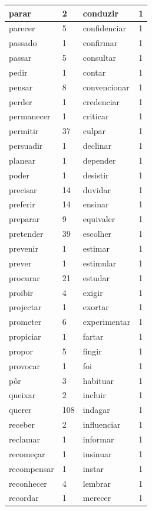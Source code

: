 \documentclass[output=paper,colorlinks,citecolor=brown]{langscibook}
\begin{document}
\begin{longtable}{ p{3cm} | p{1cm} | p{3cm} | p{1cm} }
			parar & 2 & conduzir & 1\\\hline
			parecer & 5 & confidenciar & 1\\\hline
			passado & 1 & confirmar & 1\\\hline
			passar & 5 & consultar & 1\\\hline
			pedir & 1 & contar & 1\\\hline
			pensar & 8 & convencionar & 1\\\hline
			perder & 1 & credenciar & 1\\\hline
			permanecer & 1 & criticar & 1\\\hline
			permitir & 37 & culpar & 1\\\hline
			persuadir & 1 & declinar & 1\\\hline
			planear & 1 & depender & 1\\\hline
			poder & 1 & desistir & 1\\\hline
			precisar & 14 & duvidar & 1\\\hline
			preferir & 14 & ensinar & 1\\\hline
			preparar & 9 & equivaler & 1\\\hline
			pretender & 39 & escolher & 1\\\hline
			prevenir & 1 & estimar & 1\\\hline
			prever & 1 & estimular & 1\\\hline
			procurar & 21 & estudar & 1\\\hline
			proibir & 4 & exigir & 1\\\hline
			projectar & 1 & exortar & 1\\\hline
			prometer & 6 & experimentar & 1\\\hline
			propiciar & 1 & fartar & 1\\\hline
			propor & 5 & fingir & 1\\\hline
			provocar & 1 & foi & 1\\\hline
			pôr & 3 & habituar & 1\\\hline
			queixar & 2 & incluir & 1\\\hline
			querer & 108 & indagar & 1\\\hline
			receber & 2 & influenciar & 1\\\hline
			reclamar & 1 & informar & 1\\\hline
			recomeçar & 1 & insinuar & 1\\\hline
			recompensar & 1 & instar & 1\\\hline
			reconhecer & 4 & lembrar & 1\\\hline
			recordar & 1 & merecer & 1\\\hline

\end{longtable}
\end{document}

